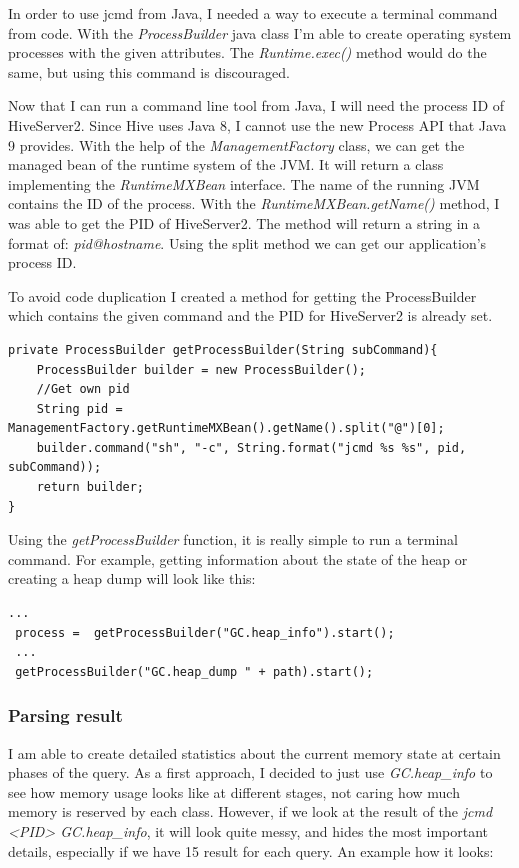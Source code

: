 In order to use jcmd from Java, I needed a way to execute a terminal command from code. With the \textit{ProcessBuilder} java class I'm able to create operating system processes with the given attributes. The \textit{Runtime.exec()} method would do the same, but using this command is discouraged. 

Now that I can run a command line tool from Java, I will need the process ID of HiveServer2. Since Hive uses Java 8, I cannot use the new Process API that Java 9 provides. With the help of the \textit{ManagementFactory} class, we can get the managed bean of the runtime system of the JVM. It will return a class implementing the \textit{RuntimeMXBean} interface. The name of the running JVM contains the ID of the process. With the \textit{RuntimeMXBean.getName()} method, I was able to get the PID of HiveServer2. The method will return a string in a format of: \textit{pid@hostname}. Using the split method we can get our application's process ID.

To avoid code duplication I created a method for getting the ProcessBuilder which contains the given command and the PID for HiveServer2 is already set.

\begin{lstlisting}
private ProcessBuilder getProcessBuilder(String subCommand){
	ProcessBuilder builder = new ProcessBuilder();
	//Get own pid
	String pid = ManagementFactory.getRuntimeMXBean().getName().split("@")[0];
	builder.command("sh", "-c", String.format("jcmd %s %s", pid, subCommand));
	return builder;
}
\end{lstlisting}

Using the \textit{getProcessBuilder} function, it is really simple to run a terminal command. For example, getting information about the state of the heap or creating a heap dump will look like this:

\begin{lstlisting}
...
 process =  getProcessBuilder("GC.heap_info").start();
 ...
 getProcessBuilder("GC.heap_dump " + path).start();
\end{lstlisting}

\subsubsection{Parsing result}
I am able to create detailed statistics about the current memory state at certain phases of the query. As a first approach, I decided to just use \textit{GC.heap\_info} to see how memory usage looks like at different stages, not caring how much memory is reserved by each class. However, if we look at the result of the \textit{jcmd <PID> GC.heap\_info}, it will look quite messy, and hides the most important details, especially if we have 15 result for each query. An example how it looks:

